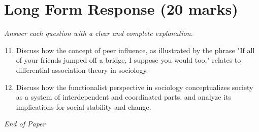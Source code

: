 \documentclass[12pt]{article}
\begin{document}
\section*{Long Form Response (20 marks)}
\textit{Answer each question with a clear and complete explanation.}
\begin{enumerate}[label=\arabic*.]
\setcounter{enumi}{10}
\item Discuss how the concept of peer influence, as illustrated by the phrase "If all of your friends jumped off a bridge, I suppose you would too," relates to differential association theory in sociology.
\item Discuss how the functionalist perspective in sociology conceptualizes society as a system of interdependent and coordinated parts, and analyze its implications for social stability and change.
\end{enumerate}

\vfill
\noindent\textit{End of Paper}
\end{document}
